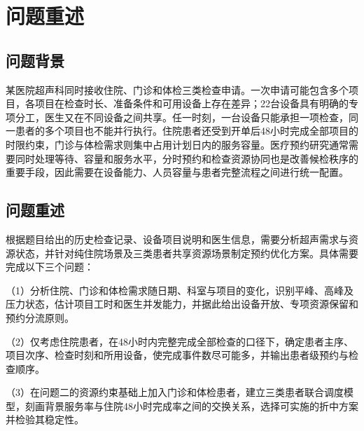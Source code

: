\section{问题重述}

\subsection{问题背景}

某医院超声科同时接收住院、门诊和体检三类检查申请。一次申请可能包含多个项目，各项目在检查时长、准备条件和可用设备上存在差异；22台设备具有明确的专项分工，医生又在不同设备之间共享。任一时刻，一台设备只能承担一项检查，同一患者的多个项目也不能并行执行。住院患者还受到开单后48小时完成全部项目的时限约束，门诊与体检需求则集中占用计划日内的服务容量。医疗预约研究通常需要同时处理等待、容量和服务水平\cite{gupta2008,ahmadi2017}，分时预约和检查资源协同也是改善候检秩序的重要手段\cite{nhc2020,chenjuan2023}，因此需要在设备能力、人员容量与患者完整流程之间进行统一配置。

\subsection{问题重述}

根据题目给出的历史检查记录、设备项目说明和医生信息，需要分析超声需求与资源状态，并针对纯住院场景及三类患者共享资源场景制定预约优化方案。具体需要完成以下三个问题：

（1）分析住院、门诊和体检需求随日期、科室与项目的变化，识别平峰、高峰及压力状态，估计项目工时和医生并发能力，并据此给出设备开放、专项资源保留和预约分流原则。

（2）仅考虑住院患者，在48小时内完整完成全部检查的口径下，确定患者主序、项目次序、检查时刻和所用设备，使完成事件数尽可能多，并输出患者级预约与检查顺序。

（3）在问题二的资源约束基础上加入门诊和体检患者，建立三类患者联合调度模型，刻画背景服务率与住院48小时完成率之间的交换关系，选择可实施的折中方案并检验其稳定性。

